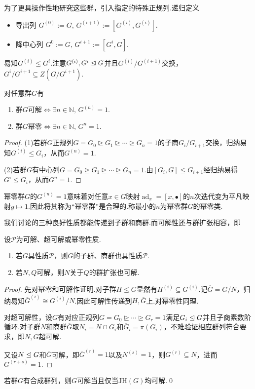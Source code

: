 为了更具操作性地研究这些群，引入指定的特殊正规列.递归定义
\begin{itemize}
	\item {\heiti 导出列} $G^{(0)}:=G,\,G^{(i+1)}:=[G^{(i)},G^{(i)}]$.
	\item {\heiti 降中心列} $G^0:=G,\,G^{i+1}:=[G^i,G]$.
\end{itemize}

易知$G^{(i)}\le G^i$.注意$G^{(i)},G^i\trianglelefteq G$并且$G^{(i)}/G^{(i+1)}$交换，$G^i/G^{i+1}\subseteq Z(G/G^{i+1})$.
\begin{prop}
	对任意群$G$有
	\begin{enumerate}
		\item 群$G$可解$\iff\exists n\in\mathbb{N},\,G^{(n)}=1$.
		\item 群$G$幂零$\iff\exists n\in\mathbb{N},\,G^n=1$.
	\end{enumerate}
\end{prop}
\begin{proof}
	\hspace*{5.4pt}(1)若群$G$正规列$G=G_0\trianglerighteq G_1\trianglerighteq\cdots\trianglerighteq G_n=1$的子商$G_{i}/G_{i+1}$交换，归纳易知$G^{(i)}\le G_i$，从而$G^{(n)}=1$.

	(2)若群$G$有中心列$G=G_0\trianglerighteq G_1\trianglerighteq\cdots\trianglerighteq G_n=1$.由$[G_i,G]\le G_{i+1}$经归纳易得$G^i\le G_i$，从而$G^n=1$.
\end{proof}
\begin{remark}
	幂零群$G$的$G^{(n)}=1$意味着对任意$x\in G$映射$\operatorname*{ad}_x=[x,\bullet]$的$n$次迭代变为平凡映射$g\mapsto 1$.因此将其称为“幂零群”是合理的.称最小的$n$为幂零群$G$的{\heiti 幂零类}\footnotemark.
\end{remark}


我们讨论的三种良好性质都能传递到子群和商群.而可解性还与群扩张相容，即
\begin{prop}
	设$\mathcal{P}$为可解、超可解或幂零性质.
	\begin{enumerate}
		\item 若$G$具性质$\mathcal{P}$，则$G$的子群、商群也具性质$\mathcal{P}$.
		\item 若$N,Q$可解，则$N$关于$Q$的群扩张也可解.
	\end{enumerate}
\end{prop}
\begin{proof}
	先对幂零和可解作证明.对子群$H\le G$显然有$H^{(i)}\subseteq G^{(i)}$.记$\overline{G}=G/N$，归纳易知$\overline{G}^{(i)}\cong G^{(i)}/N$.因此可解性传递到$H,\overline{G}$上.对幂零性同理.

	对超可解性，设$G$有对应正规列$G=G_0\trianglerighteq\cdots\trianglerighteq G_r=1$满足$G_i\trianglelefteq G$并且子商素数阶循环.对子群$N$和商群$\overline{G}$取$N_i=N\cap G_i$和$\overline{G}_i=\pi(G_i)$，不难验证相应群列符合要求，即$N,\overline{G}$超可解.
	
	又设$N\trianglelefteq G$和$\overline{G}$可解，即$\overline{G}^{(r)}=1$以及$N^{(s)}=1$，则$G^{(r)}\subseteq N$，进而$G^{(r+s)}=1$.
\end{proof}
\begin{cor*}
	若群$G$有合成群列，则$G$可解当且仅当$\mathrm{JH}(G)$均可解.\qed
\end{cor*}

